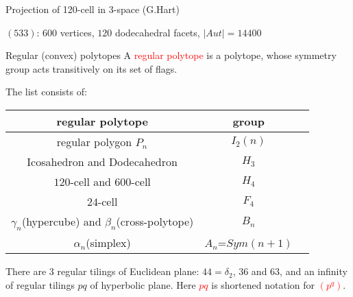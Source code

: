 \documentclass[%
pdf,
colorBG,
slideColor,
]{prosper}
\begin{document}
\begin{slide}{Projection of 120-cell in 3-space (G.Hart)}
\begin{center}
\begin{minipage}{8.5cm}
\centering
{}\par
\end{minipage}
\end{center}
\begin{center}
$(533)$: $600$ vertices, $120$ dodecahedral facets, $|Aut|=14400$
\end{center}
\end{slide}



\begin{slide}{Regular (convex) polytopes}
\vspace{-3mm}
A \textcolor{red}{regular polytope} is a polytope, whose symmetry group 
acts transitively on its set of flags.

The list consists of: 
\begin{center}
\begin{tabular}{|c|c|c|}
\hline
regular polytope &group\\
\hline
regular polygon $P_n$          &$I_2(n)$\\
Icosahedron and Dodecahedron   &$H_3$\\
$120$-cell and $600$-cell      &$H_4$\\
$24$-cell                      &$F_4$\\
$\gamma_n$(hypercube) and $\beta_n$(cross-polytope) &$B_n$\\
$\alpha_n$(simplex)            &$A_n$=$Sym(n+1)$\\
\hline
\end{tabular}
\end{center}
There are $3$ regular tilings of Euclidean plane:
$44= \delta_2$, $36$ and $63$,
and an infinity of regular tilings $pq$ of hyperbolic 
plane. Here \textcolor{red}{$pq$} is shortened notation for
\textcolor{red}{$(p^q)$}.
\end{slide}
\end{document}
